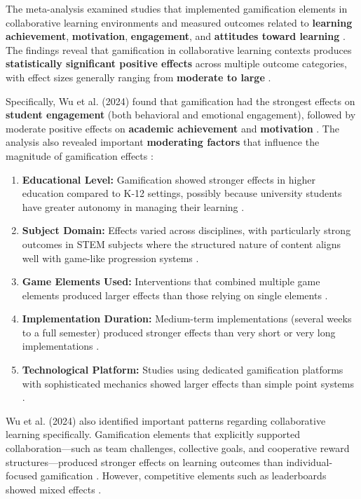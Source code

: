 \documentclass[12pt,a4paper]{article}
\begin{document}
The meta-analysis examined studies that implemented gamification elements in collaborative learning environments and measured outcomes related to \textbf{learning achievement}, \textbf{motivation}, \textbf{engagement}, and \textbf{attitudes toward learning} \parencite{wu2024}. The findings reveal that gamification in collaborative learning contexts produces \textbf{statistically significant positive effects} across multiple outcome categories, with effect sizes generally ranging from \textbf{moderate to large} \parencite{wu2024}.

Specifically, Wu et al. (2024) found that gamification had the strongest effects on \textbf{student engagement} (both behavioral and emotional engagement), followed by moderate positive effects on \textbf{academic achievement} and \textbf{motivation} \parencite{wu2024}. The analysis also revealed important \textbf{moderating factors} that influence the magnitude of gamification effects \parencite{wu2024}:

\begin{enumerate}
    \item \textbf{Educational Level:} Gamification showed stronger effects in higher education compared to K-12 settings, possibly because university students have greater autonomy in managing their learning \parencite{wu2024}.
    
    \item \textbf{Subject Domain:} Effects varied across disciplines, with particularly strong outcomes in STEM subjects where the structured nature of content aligns well with game-like progression systems \parencite{wu2024}.
    
    \item \textbf{Game Elements Used:} Interventions that combined multiple game elements produced larger effects than those relying on single elements \parencite{wu2024}.
    
    \item \textbf{Implementation Duration:} Medium-term implementations (several weeks to a full semester) produced stronger effects than very short or very long implementations \parencite{wu2024}.
    
    \item \textbf{Technological Platform:} Studies using dedicated gamification platforms with sophisticated mechanics showed larger effects than simple point systems \parencite{wu2024}.
\end{enumerate}

Wu et al. (2024) also identified important patterns regarding collaborative learning specifically. Gamification elements that explicitly supported collaboration—such as team challenges, collective goals, and cooperative reward structures—produced stronger effects on learning outcomes than individual-focused gamification \parencite{wu2024}. However, competitive elements such as leaderboards showed mixed effects \parencite{wu2024}.
\end{document}
